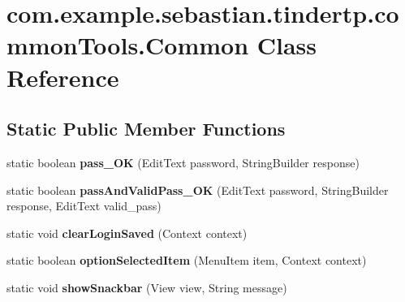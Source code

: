 \hypertarget{classcom_1_1example_1_1sebastian_1_1tindertp_1_1commonTools_1_1Common}{}\section{com.\+example.\+sebastian.\+tindertp.\+common\+Tools.\+Common Class Reference}
\label{classcom_1_1example_1_1sebastian_1_1tindertp_1_1commonTools_1_1Common}
\subsection*{Static Public Member Functions}
\begin{DoxyCompactItemize}
\item 
static boolean {\bfseries pass\+\_\+\+OK} (Edit\+Text password, String\+Builder response)\hypertarget{classcom_1_1example_1_1sebastian_1_1tindertp_1_1commonTools_1_1Common_aa8a00a26fec3015d703474c715548ceb}{}\label{classcom_1_1example_1_1sebastian_1_1tindertp_1_1commonTools_1_1Common_aa8a00a26fec3015d703474c715548ceb}

\item 
static boolean {\bfseries pass\+And\+Valid\+Pass\+\_\+\+OK} (Edit\+Text password, String\+Builder response, Edit\+Text valid\+\_\+pass)\hypertarget{classcom_1_1example_1_1sebastian_1_1tindertp_1_1commonTools_1_1Common_a78441ca2d9b2600fceccdff37c079c31}{}\label{classcom_1_1example_1_1sebastian_1_1tindertp_1_1commonTools_1_1Common_a78441ca2d9b2600fceccdff37c079c31}

\item 
static void {\bfseries clear\+Login\+Saved} (Context context)\hypertarget{classcom_1_1example_1_1sebastian_1_1tindertp_1_1commonTools_1_1Common_a602f78b647b4c1617a2173a9d94d97a1}{}\label{classcom_1_1example_1_1sebastian_1_1tindertp_1_1commonTools_1_1Common_a602f78b647b4c1617a2173a9d94d97a1}

\item 
static boolean {\bfseries option\+Selected\+Item} (Menu\+Item item, Context context)\hypertarget{classcom_1_1example_1_1sebastian_1_1tindertp_1_1commonTools_1_1Common_ad5a698303b87f0930ce1f129d87e22c2}{}\label{classcom_1_1example_1_1sebastian_1_1tindertp_1_1commonTools_1_1Common_ad5a698303b87f0930ce1f129d87e22c2}

\item 
static void {\bfseries show\+Snackbar} (View view, String message)\hypertarget{classcom_1_1example_1_1sebastian_1_1tindertp_1_1commonTools_1_1Common_af59bc9ff042336c3d62c4bc55bd45499}{}\label{classcom_1_1example_1_1sebastian_1_1tindertp_1_1commonTools_1_1Common_af59bc9ff042336c3d62c4bc55bd45499}


\end{DoxyCompactItemize}
